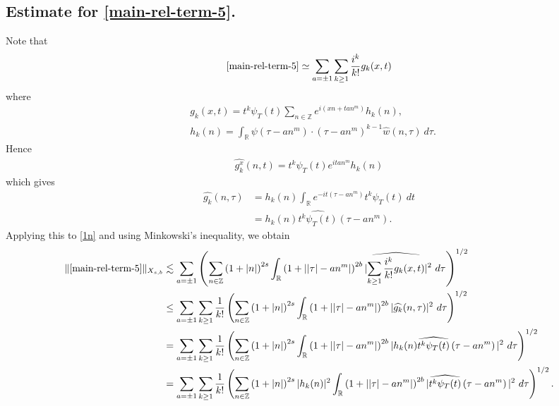 \documentclass[12pt,reqno]{amsart}
\numberwithin{equation}{section}  %
\numberwithin{figure}{section}
\newcommand{\rr}{\mathbb{R}}
\newcommand{\zz}{\mathbb{Z}}
\newcommand{\wh}{\widehat}
\theoremstyle{plain}
\theoremstyle{definition}
\theoremstyle{remark}
\begin{document}
\subsection{Estimate for \eqref{main-rel-term-5}.}
Note that
%
%
\begin{equation}
	\label{1n}
	\begin{split}
    \eqref{main-rel-term-5} \simeq \sum_{a = \pm 1}\sum_{k \ge 1}
		\frac{i^k}{k!}g_k(x,t)
	\end{split}
\end{equation}
%
%
where 
%
%
\begin{equation*}
	\begin{split}
		& g_k(x,t) = t^k \psi_{T}(t) \sum_{n \in \zz} e^{i\left( xn + tan^{m}
		\right)} h_k(n),
		\\
		& h_k(n) = \int_\rr \psi \left( \tau - an^{m } \right) \cdot \left(
		\tau - an^{m } \right)^{k -1} \wh{w}(n, \tau) \ d \tau.
	\end{split}
\end{equation*}
%
%
Hence
%
%
\begin{equation*}
	\begin{split}
		\wh{g_k^x}(n, t) = t^{k} \psi_{T}(t) e^{i t an^{m }} h_k(n)
	\end{split}
\end{equation*}
%
%
which gives
%
%
\begin{equation*}
	\begin{split}
		\wh{g_k}(n, \tau)
		& = h_k(n) \int_\rr e^{-it\left( \tau - an^{m } \right)}
		t^{k}\psi_{T}(t) \ dt
		\\
		& = h_k(n) \wh{t^{k}\psi_{T}(t)} \left( \tau - an^{m } \right).
	\end{split}
\end{equation*}
%
%
Applying this to \eqref{1n} and using Minkowski's inequality, we obtain
%
%
\begin{equation}
	\label{2n}
	\begin{split}
		\|\eqref{main-rel-term-5}\|_{X_{s,b}} 
    & \lesssim \sum_{a = \pm 1} \left( \sum_{n \in \zz} \left (1 + |n| \right
    )^{2s} \int_\rr \left( 1 + | |\tau| - an^{m } | \right)^{2b}
    | \wh{\sum_{k \ge 1} \frac{i^k}{k!}g_k(x,t)} |^2 \ d \tau
		\right)^{1/2}
		\\
		& \le \sum_{a = \pm 1}\sum_{k \ge 1} \frac{1}{k!}\left( \sum_{n \in \zz} \left (1 + |n| \right )^{2s}
    \int_\rr \left( 1 + | |\tau| - an^{m } | \right)^{2b} | \wh{g_k}(n, \tau) |^2 \
		d \tau \right)^{1/2}
		\\
		& = \sum_{a = \pm 1}\sum_{k \ge 1} \frac{1}{k!} \left( \sum_{n \in \zz} \left (1 + |n| \right )^{2s}
    \int_\rr \left( 1 + | |\tau| - an^{m } | \right)^{2b} | h_k(n) \wh{t^k
		\psi_{T}(t)} \left( \tau - an^{m } \right) |^2 \ d \tau \right)^{1/2}
		\\
		& = \sum_{a = \pm 1}\sum_{k \ge 1} \frac{1}{k!} \left( \sum_{n \in \zz} \left (1 + |n| \right )^{2s} |
    h_k(n) |^2 \int_\rr \left( 1 + | |\tau| - an^{m } | \right)^{2b} | \wh{t^k
		\psi_{T}(t)} \left( \tau - an^{m } \right) |^2 \ d \tau \right)^{1/2}.
	\end{split}
\end{equation}
\end{document}
